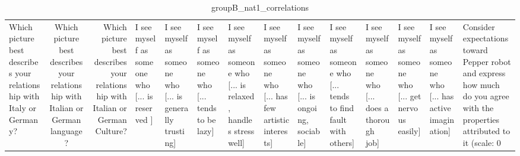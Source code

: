 \begin{table}
\caption{groupB_nat1_correlations}
\label{tab:groupB_nat1_correlations}
\begin{tabular}{lcr}
\toprule
Which picture best describes your relationship with Italy or Germany? & Which picture best describes your relationship with Italian or German language? & Which picture best describes your relationship with Italian or German Culture? & I see myself as someone who  [... is reserved ] & I see myself as someone who  [... is generally trusting] & I see myself as someone who  [... tends to be lazy] & I see myself as someone who  [... is relaxed, handles stress well] & I see myself as someone who  [... has few artistic interests] & I see myself as someone who  [... is ongoing, sociable] & I see myself as someone who  [... tends to find fault with others] & I see myself as someone who  [... does a thorough job] & I see myself as someone who  [... get nervous easily] & I see myself as someone who  [... has active imagination] & Consider expectations toward Pepper robot and express how much do you agree with the properties attributed to it (scale: 0%
\end{tabular}
\end{table}
